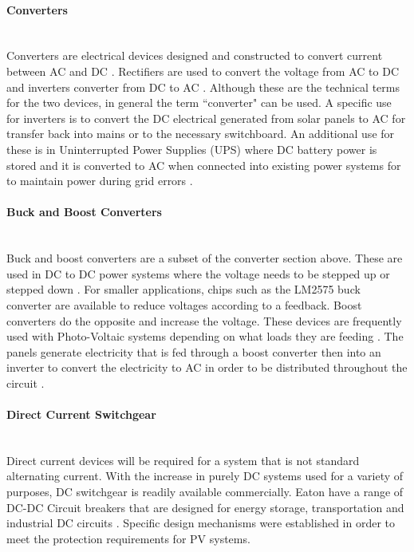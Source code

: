 \paragraph{Converters} \label{section:litreview-converters}
~\\
Converters are electrical devices designed and constructed to convert current between AC and DC \cite{website:ConvVsInverter}. Rectifiers are used to convert the voltage from AC to DC and inverters converter from DC to AC \cite{website:ConvVsInverter}. Although these are the technical terms for the two devices, in general the term ``converter" can be used. A specific use for inverters is to convert the DC electrical generated from solar panels to AC for transfer back into mains or to the necessary switchboard. An additional use for these is in Uninterrupted Power Supplies (UPS) where DC battery power is stored and it is converted to AC when connected into existing power systems for to maintain power during grid errors \cite{website:ConvVsInverter}.

\paragraph{Buck and Boost Converters}
~\\
Buck and boost converters are a subset of the converter section above. These are used in DC to DC power systems where the voltage needs to be stepped up or stepped down \cite{textbook:Abu-Rub2014}. For smaller applications, chips such as the LM2575 buck converter are available to reduce voltages according to a feedback. Boost converters do the opposite and increase the voltage. These devices are frequently used with Photo-Voltaic systems depending on what loads they are feeding \cite{textbook:Abu-Rub2014}. The panels generate electricity that is fed through a boost converter then into an inverter to convert the electricity to AC in order to be distributed throughout the circuit \cite{textbook:Abu-Rub2014}.  

\paragraph{Direct Current Switchgear} \label{litreview:dc-devices}
~\\
Direct current devices will be required for a system that is not standard alternating current. With the increase in purely DC systems used for a variety of purposes, DC switchgear is readily available commercially. Eaton have a range of DC-DC Circuit breakers that are designed for energy storage, transportation and industrial DC circuits \cite{website:Eaton1}. Specific design mechanisms were established in order to meet the protection requirements for PV systems. 
\newline

